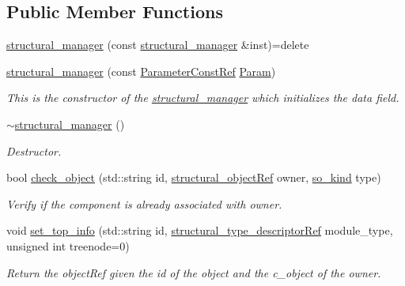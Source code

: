 \subsection*{Public Member Functions}
\begin{DoxyCompactItemize}
\item 
\hyperlink{classstructural__manager_a7b35940c4261bd2b7bd8faa335c783bd}{structural\+\_\+manager} (const \hyperlink{classstructural__manager}{structural\+\_\+manager} \&inst)=delete
\item 
\hyperlink{classstructural__manager_acf1e3ec619e5155e06bfbfd2300db4a9}{structural\+\_\+manager} (const \hyperlink{Parameter_8hpp_a37841774a6fcb479b597fdf8955eb4ea}{Parameter\+Const\+Ref} \hyperlink{classstructural__manager_a4796736ce9b888ff69ba88a37bab2ed1}{Param})
\begin{DoxyCompactList}\small\item\em This is the constructor of the \hyperlink{classstructural__manager}{structural\+\_\+manager} which initializes the data field. \end{DoxyCompactList}\item 
\hyperlink{classstructural__manager_a747b18acfc511605b21c6798c089a096}{$\sim$structural\+\_\+manager} ()
\begin{DoxyCompactList}\small\item\em Destructor. \end{DoxyCompactList}\item 
bool \hyperlink{classstructural__manager_a9fbb1019c9ffe7b78303ce0d85200ad6}{check\+\_\+object} (std\+::string id, \hyperlink{structural__objects_8hpp_a8ea5f8cc50ab8f4c31e2751074ff60b2}{structural\+\_\+object\+Ref} owner, \hyperlink{structural__objects_8hpp_acf52399aecacb7952e414c5746ce6439}{so\+\_\+kind} type)
\begin{DoxyCompactList}\small\item\em Verify if the component is already associated with owner. \end{DoxyCompactList}\item 
void \hyperlink{classstructural__manager_a848a594d01b214d2b17deefdc127ca71}{set\+\_\+top\+\_\+info} (std\+::string id, \hyperlink{structural__objects_8hpp_a219296792577e3292783725961506c83}{structural\+\_\+type\+\_\+descriptor\+Ref} module\+\_\+type, unsigned int treenode=0)
\begin{DoxyCompactList}\small\item\em Return the object\+Ref given the id of the object and the c\+\_\+object of the owner. \end{DoxyCompactList}\item 

\end{DoxyCompactItemize}
